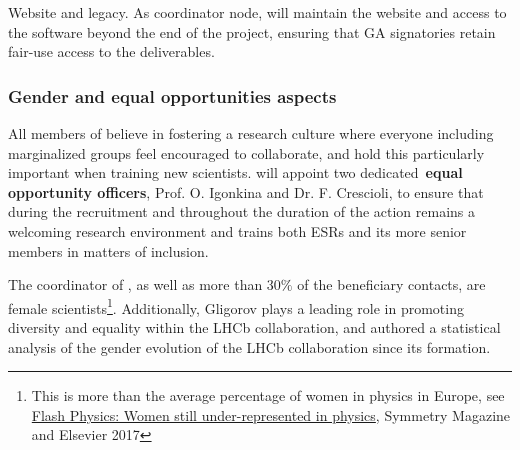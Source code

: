 \noindent \color{blue}Website and legacy. \color{black} 
As coordinator node, \lund will maintain the \acronym website and access to the software beyond the end of the project, ensuring that GA signatories retain fair-use access to the deliverables.



\vspace{-2mm}
\subsubsection{Gender and equal opportunities aspects}
\label{sub:genderEO}

All members of \acronym believe in fostering a research culture where everyone including marginalized groups feel encouraged to collaborate, and hold this particularly important when training new scientists. 
\acronym will appoint two dedicated~\textbf{equal opportunity officers}, Prof. O. Igonkina and Dr. F. Crescioli, to ensure that during the recruitment and throughout the duration of the action \acronym remains a welcoming research environment and trains both ESRs and its more senior members in matters of inclusion. 

The coordinator of \acronym, as well as more than $30\%$ of the beneficiary contacts, are female scientists\footnote{This is more than the average percentage of women in physics in Europe, see \href{http://physicsworld.com/cws/article/news/2017/mar/09/flash-physics-women-still-under-represented-in-physics-paint-drying-mystery-solved-ligo-s-ronald-drever-dies}{Flash Physics: Women still under-represented in physics}, Symmetry Magazine and Elsevier 2017}. 
Additionally, Gligorov plays a leading role in promoting diversity and equality within the LHCb collaboration, and authored a statistical analysis of the gender evolution of the LHCb collaboration since its formation. 

